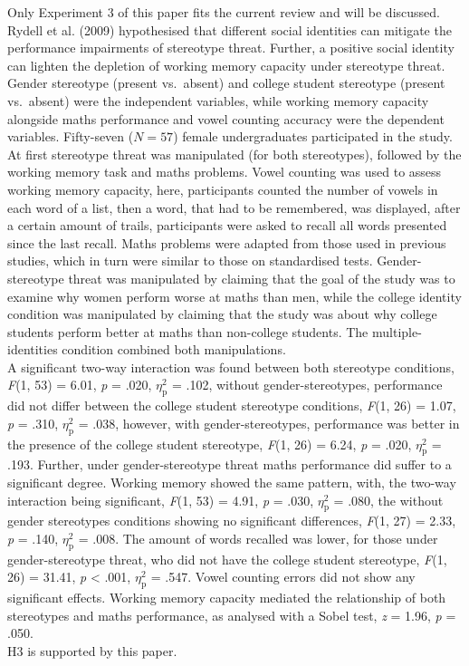\documentclass[
  stu,floatsintext]{apa7}
\begin{document}
Only Experiment 3 of this paper fits the current review and will be discussed.
Rydell et al. (2009) hypothesised that different social identities can mitigate the performance impairments of stereotype threat.
Further, a positive social identity can lighten the depletion of working memory capacity under stereotype threat.\\
Gender stereotype (present vs.~absent) and college student stereotype (present vs.~absent) were the independent variables, while working memory capacity alongside maths performance and vowel counting accuracy were the dependent variables.
Fifty-seven (\(N = 57\)) female undergraduates participated in the study.
At first stereotype threat was manipulated (for both stereotypes), followed by the working memory task and maths problems.
Vowel counting was used to assess working memory capacity, here, participants counted the number of vowels in each word of a list, then a word, that had to be remembered, was displayed, after a certain amount of trails, participants were asked to recall all words presented since the last recall.
Maths problems were adapted from those used in previous studies, which in turn were similar to those on standardised tests.
Gender-stereotype threat was manipulated by claiming that the goal of the study was to examine why women perform worse at maths than men, while the college identity condition was manipulated by claiming that the study was about why college students perform better at maths than non-college students.
The multiple-identities condition combined both manipulations.\\
A significant two-way interaction was found between both stereotype conditions, \emph{F}(1, 53) = 6.01, \emph{p} = .020, \(\eta^{2}_{\text{p}}\) = .102, without gender-stereotypes, performance did not differ between the college student stereotype conditions, \emph{F}(1, 26) = 1.07, \emph{p} = .310, \(\eta^{2}_{\text{p}}\) = .038, however, with gender-stereotypes, performance was better in the presence of the college student stereotype, \emph{F}(1, 26) = 6.24, \emph{p} = .020, \(\eta^{2}_{\text{p}}\) = .193.
Further, under gender-stereotype threat maths performance did suffer to a significant degree.
Working memory showed the same pattern, with, the two-way interaction being significant, \emph{F}(1, 53) = 4.91, \emph{p} = .030, \(\eta^{2}_{\text{p}}\) = .080, the without gender stereotypes conditions showing no significant differences, \emph{F}(1, 27) = 2.33, \emph{p} = .140, \(\eta^{2}_{\text{p}}\) = .008.
The amount of words recalled was lower, for those under gender-stereotype threat, who did not have the college student stereotype, \emph{F}(1, 26) = 31.41, \emph{p} \textless{} .001, \(\eta^{2}_{\text{p}}\) = .547.
Vowel counting errors did not show any significant effects.
Working memory capacity mediated the relationship of both stereotypes and maths performance, as analysed with a Sobel test, \emph{z} = 1.96, \emph{p} = .050.\\
H3 is supported by this paper.
\end{document}
